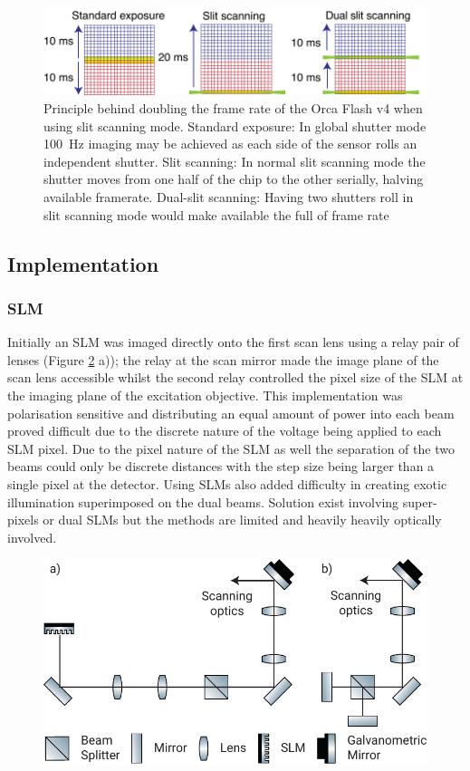 \begin{figure}
  \centering
  \includegraphics{dual_slit_scanning}
  \caption{
  Principle behind doubling the frame rate of the Orca Flash v4 when using slit scanning mode.
  Standard exposure: In global shutter mode \SI{100}{\hertz} imaging may be achieved as each side of the sensor rolls an independent shutter.
  Slit scanning: In normal slit scanning mode the shutter moves from one half of the chip to the other serially, halving available framerate.
  Dual-slit scanning:
  Having two shutters roll in slit scanning mode would make available the full of frame rate
  }
  \label{fig:dual_slit_scanning}
\end{figure}

\subsection{Implementation}
\subsubsection{SLM}
Initially an SLM was imaged directly onto the first scan lens using a relay pair of lenses (Figure \ref{fig:dual_beam_layouts} a)); the relay at the scan mirror made the image plane of the scan lens accessible whilst the second relay controlled the pixel size of the SLM at the imaging plane of the excitation objective.
This implementation was polarisation sensitive and distributing an equal amount of power into each beam proved difficult due to the discrete nature of the voltage being applied to each SLM pixel.
Due to the pixel nature of the SLM as well the separation of the two beams could only be discrete distances with the step size being larger than a single pixel at the detector.
Using SLMs also added difficulty in creating exotic illumination superimposed on the dual beams.
Solution exist involving super-pixels or dual SLMs \cite{tiled_lightsheet_that_guy_from_betzig_lab_wei} but the methods are limited and heavily heavily optically involved.

\begin{figure}
  \centering
  \includegraphics{dual_beam_layouts}
  \caption{}
  \label{fig:dual_beam_layouts}
\end{figure}


